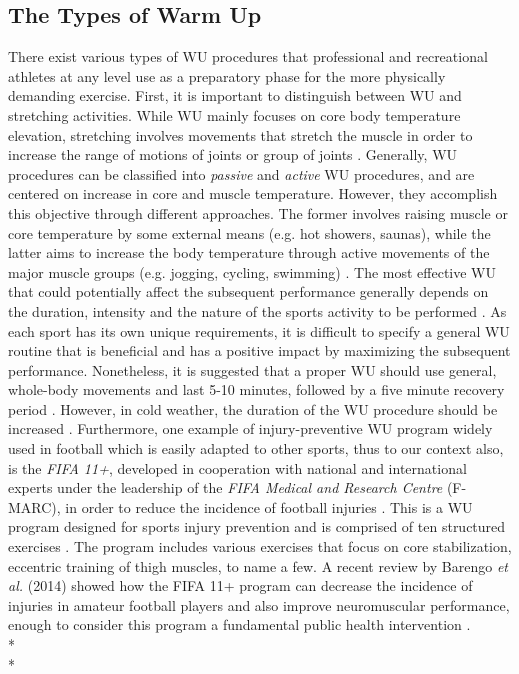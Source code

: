 \subsection{The Types of Warm Up}
There exist various types of WU procedures that professional and recreational athletes at any level use as a preparatory phase for the more physically demanding exercise. First, it is important to distinguish between WU and stretching activities. While WU mainly focuses on core body temperature elevation, stretching involves movements that stretch the muscle in order to increase the range of motions of joints or group of joints \cite{knudson2008warm}. 
Generally, WU procedures can be classified into \textit{passive} and \textit{active} WU procedures, and are centered on increase in core and muscle temperature. However, they accomplish this objective through different approaches. The former involves raising muscle or core temperature by some external means (e.g. hot showers, saunas), while the latter aims to increase the body temperature through active movements of the major muscle groups (e.g. jogging, cycling, swimming) \cite{shellock1985warming, bishop2003warm2}. The most effective WU that could potentially affect the subsequent performance generally depends on the duration, intensity and the nature of the sports activity to be performed \cite{bishop2003warm2}. As each sport has its own unique requirements, it is difficult to specify a general WU routine that is beneficial and has a positive impact by maximizing the subsequent performance. Nonetheless, it is suggested that a proper WU should use general, whole-body movements and last 5-10 minutes, followed by a five minute recovery period \cite{bishop2003warm2}. However, in cold weather, the duration of the WU procedure should be increased \cite{mayr2015prevention}. %
Furthermore, one example of injury-preventive WU program widely used in football which is easily adapted to other sports, thus to our context also, is the \textit{FIFA 11+}, developed in cooperation with national and international experts under the leadership of the \textit{FIFA Medical and Research Centre }(F-MARC), in order to
reduce the incidence of football injuries \cite{mayr2015prevention}. This is a WU
program designed for sports injury prevention and is comprised of ten structured exercises \cite{fifa}. The program includes various exercises that focus on core stabilization, eccentric training of thigh muscles, to name a few. A recent review by Barengo \textit{et al.} (2014) showed how the FIFA 11+ program can decrease the incidence of injuries in amateur football players and also improve neuromuscular performance, enough to consider this program a fundamental public health intervention \cite{barengo2014impact}.\\*\\*
